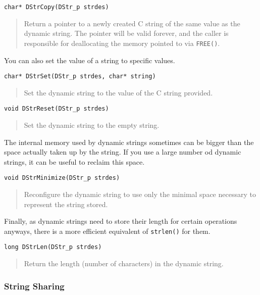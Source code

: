 \begin{verbatim}
char* DStrCopy(DStr_p strdes)
\end{verbatim}
\begin{quote}
  Return a pointer to a newly created C string of the same value as
  the dynamic string. The pointer will be valid forever, and the
  caller is responsible for deallocating the memory pointed to via
  \texttt{FREE()}.
\end{quote}

You can also set the value of a string to specific values.

\begin{verbatim}
char* DStrSet(DStr_p strdes, char* string)
\end{verbatim}
\begin{quote}
  Set the dynamic string to the value of the C string provided.
\end{quote}

\begin{verbatim}
void DStrReset(DStr_p strdes)
\end{verbatim}
\begin{quote}
  Set the dynamic string to the empty string.
\end{quote}

The internal memory used by dynamic strings sometimes can be bigger
than the space actually taken up by the string. If you use a large
number od dynamic strings, it can be useful to reclaim this space.

\begin{verbatim}
void DStrMinimize(DStr_p strdes)
\end{verbatim}
\begin{quote}
  Reconfigure the dynamic string to use only the minimal space
  necessary to represent the string stored.
\end{quote}

Finally, as dynamic strings need to store their length for certain
operations anyways, there is a more efficient equivalent of
\texttt{strlen()} for them.

\begin{verbatim}
long DStrLen(DStr_p strdes)
\end{verbatim}
\begin{quote}
  Return the length (number of characters) in the dynamic string.
\end{quote}



\subsubsection{String Sharing}

